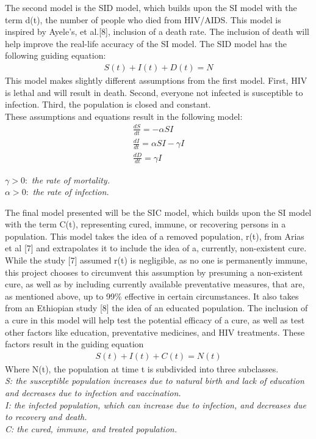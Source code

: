 \documentclass[a4paper, final, 12pt]{article}
\numberwithin{equation}{section}
\begin{document}
The second model is the SID model, which builds upon the SI model with the term d(t), the number of people who died from HIV/AIDS. This model is inspired by Ayele's, et al.[8], inclusion of a death rate. The inclusion of death will help improve the real-life accuracy of the SI model. The SID model has the following guiding equation:
    \begin{align}
        S(t) + I(t) + D(t) = N
    \end{align}
\hspace{22pt} This model makes slightly different assumptions from the first model. First, HIV is lethal and will result in death. Second, everyone not infected is susceptible to infection. Third, the population is closed and constant. \\

These assumptions and equations result in the following model:
\begin{align}
    \frac{dS}{dt} = -\alpha SI \\
    \frac{dI}{dt} = \alpha SI - \gamma I \\
    \frac{dD}{dt} = \gamma I
\end{align}
\begin{center}
    \(\gamma > 0: \) \textit{the rate of mortality.}\\
    \(\alpha > 0: \) \textit{the rate of infection.}
\end{center}
\hspace{22pt}
The final model presented will be the SIC model, which builds upon the SI model with the term C(t), representing cured, immune, or recovering persons in a population. This model takes the idea of a removed population, r(t), from Arias et al [7] and extrapolates it to include the idea of a, currently, non-existent cure. While the study [7] assumed r(t) is negligible, as no one is permanently immune, this project chooses to circumvent this assumption by presuming a non-existent cure, as well as by including currently available preventative measures, that are, as mentioned above, up to 99\% effective in certain circumstances. It also takes from an Ethiopian study [8] the idea of an educated population. The inclusion of a cure in this model will help test the potential efficacy of a cure, as well as test other factors like education, preventative medicines, and HIV treatments.  These factors result in the guiding equation
    \begin{align}
        S(t) + I(t) + C(t) = N(t)
    \end{align}
 Where N(t), the population at time t is subdivided into three subclasses. \\
\textit{
S: the susceptible population increases due to natural birth and lack of education and decreases due to infection and vaccination. \\
I: the infected population, which can increase due to infection, and decreases due to recovery and death. \\
C: the cured, immune, and treated population. \\
}
\end{document}
